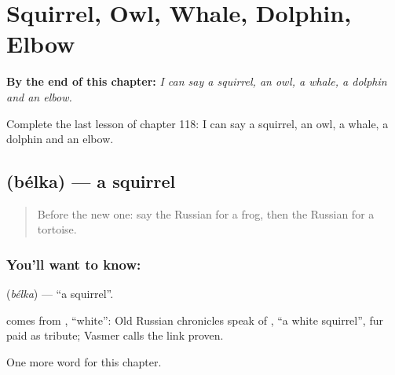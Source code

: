 
\chapter{Squirrel, Owl, Whale, Dolphin, Elbow}
\label{ch:ru-squirrel-owl-whale-dolphin-elbow}

\begin{chapteropening}
\textbf{By the end of this chapter:} \emph{I can say a squirrel, an owl, a whale, a dolphin and an elbow.}

Complete the last lesson of chapter 118: I can say a squirrel, an owl, a whale, a dolphin and an elbow.
\end{chapteropening}

\section[\texorpdfstring{\ru{белка} (bélka)}{белка (bélka)}]{ (bélka) — a squirrel}

\label{lesson:RU-C118-squirrel}



\begin{quote}
Before the new one: say the Russian for a frog, then the Russian for a tortoise.
\end{quote}

\subsection*{You'll want to know: }
\textbf{} (\emph{bélka}) — \textquotedblleft{}a squirrel\textquotedblright{}.

\begin{cousinweb}
\textbf{} comes from \emph{}, \textquotedblleft{}white\textquotedblright{}: Old Russian chronicles speak of \emph{ }, \textquotedblleft{}a white squirrel\textquotedblright{}, fur paid as tribute; Vasmer calls the link proven.
\end{cousinweb}

\begin{grammarlens}[title={What you've built}]
One more word for this chapter.
\end{grammarlens}

